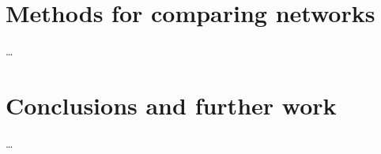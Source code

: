 \documentclass{masterthesis}
\begin{document}
\chapter{Methods for comparing networks}
\dots



\chapter{Conclusions and further work}
\dots




\appendix








\end{document}
